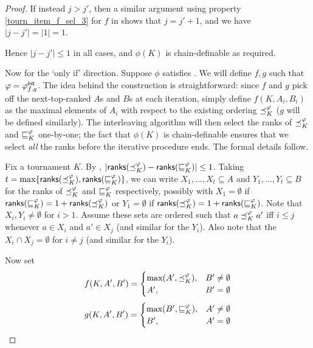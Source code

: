 \begin{proof}
    If instead $j > j'$, then a similar argument using property
    \cref{tourn_item_f_sel_3} for $f$ in  shows
    that $j = j' + 1$, and we have $|j - j'| = |1| = 1$.

    Hence $|j - j'| \le 1$ in all cases, and $\phi(K)$ is chain-definable as
    required.

    Now for the `only if' direction. Suppose $\phi$ satisfies
    \chaindef{}. We will define $f, g$ such that $\varphi = {\varphi_{f,g}^\mathsf{int}}$.
    The idea behind the construction is straightforward: since $f$ and $g$ pick
    off the next-top-ranked $A$s and $B$s at each iteration, simply define
    $f(K, A_i, B_i)$ as the maximal elements of $A_i$ with respect to the
    existing ordering ${\preceq_K^\varphi}$ ($g$ will be defined similarly). The
    interleaving algorithm will then select the ranks of ${\preceq_K^\varphi}$ and
    ${\sqsubseteq_K^\varphi}$ one-by-one; the fact that $\phi(K)$ is chain-definable
    ensures that we select \emph{all} the ranks before the iterative procedure
    ends. The formal details follow.

    Fix a tournament $K$. By ,
    $|\mathsf{ranks}({{\preceq_K^\varphi}}) - \mathsf{ranks}({{\sqsubseteq_K^\varphi}})| \le 1$. Taking $t =
    \max\{\mathsf{ranks}({{\preceq_K^\varphi}}), \mathsf{ranks}({{\sqsubseteq_K^\varphi}})\}$, we can write $X_1,
    \ldots, X_t \subseteq A$ and $Y_1, \ldots, Y_t \subseteq B$ for the ranks
    of ${\preceq_K^\varphi}$ and ${\sqsubseteq_K^\varphi}$ respectively, possibly with $X_1 =
    \emptyset$ if $\mathsf{ranks}({{\sqsubseteq_K^\varphi}}) = 1 + \mathsf{ranks}({{\preceq_K^\varphi}})$ or $Y_1 =
    \emptyset$ if $\mathsf{ranks}({{\preceq_K^\varphi}}) = 1 + \mathsf{ranks}({{\sqsubseteq_K^\varphi}})$. Note
    that $X_i, Y_i \ne \emptyset$ for $i > 1$. Assume these sets are ordered
    such that $a \preceq_K^\varphi a'$ iff $i \le j$ whenever $a \in X_i$ and $a' \in
    X_j$ (and similar for the $Y_i$). Also note that the $X_i \cap X_j =
    \emptyset$ for $i \ne j$ (and similar for the $Y_i$).

    Now set\footnotemark{}
    \[
        f(K, A', B') = \begin{cases}
           \max(A', {\preceq_K^\varphi}),& B' \ne \emptyset \\
           A',& B' = \emptyset
        \end{cases}
    \]
    \[
        g(K, A', B') = \begin{cases}
            \max(B', {\sqsubseteq_K^\varphi}),& A' \ne \emptyset \\
            B',& A' = \emptyset
        \end{cases}
    \]


\end{proof}
